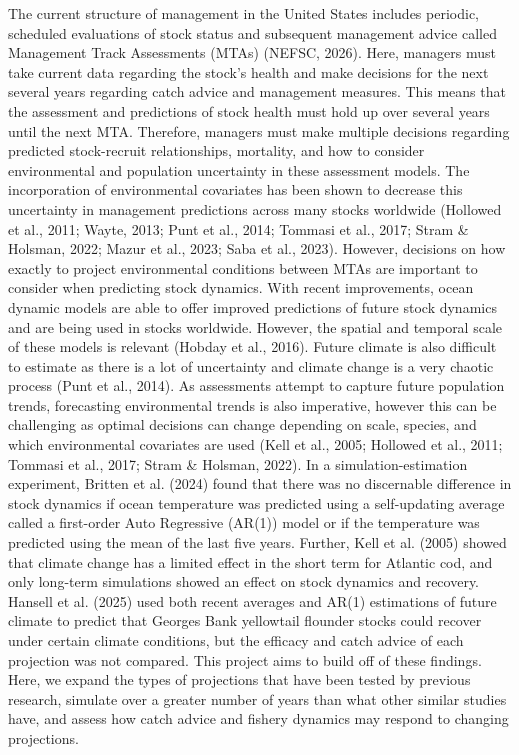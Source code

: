 \documentclass[
  12pt,
]{article}
\begin{document}
The current structure of management in the United States includes periodic, scheduled evaluations of stock status and subsequent management advice called Management Track Assessments (MTAs) (NEFSC, 2026). Here, managers must take current data regarding the stock's health and make decisions for the next several years regarding catch advice and management measures. This means that the assessment and predictions of stock health must hold up over several years until the next MTA. Therefore, managers must make multiple decisions regarding predicted stock-recruit relationships, mortality, and how to consider environmental and population uncertainty in these assessment models. The incorporation of environmental covariates has been shown to decrease this uncertainty in management predictions across many stocks worldwide (Hollowed et al., 2011; Wayte, 2013; Punt et al., 2014; Tommasi et al., 2017; Stram \& Holsman, 2022; Mazur et al., 2023; Saba et al., 2023). However, decisions on how exactly to project environmental conditions between MTAs are important to consider when predicting stock dynamics. With recent improvements, ocean dynamic models are able to offer improved predictions of future stock dynamics and are being used in stocks worldwide. However, the spatial and temporal scale of these models is relevant (Hobday et al., 2016). Future climate is also difficult to estimate as there is a lot of uncertainty and climate change is a very chaotic process (Punt et al., 2014). As assessments attempt to capture future population trends, forecasting environmental trends is also imperative, however this can be challenging as optimal decisions can change depending on scale, species, and which environmental covariates are used (Kell et al., 2005; Hollowed et al., 2011; Tommasi et al., 2017; Stram \& Holsman, 2022). In a simulation-estimation experiment, Britten et al. (2024) found that there was no discernable difference in stock dynamics if ocean temperature was predicted using a self-updating average called a first-order Auto Regressive (AR(1)) model or if the temperature was predicted using the mean of the last five years. Further, Kell et al. (2005) showed that climate change has a limited effect in the short term for Atlantic cod, and only long-term simulations showed an effect on stock dynamics and recovery. Hansell et al. (2025) used both recent averages and AR(1) estimations of future climate to predict that Georges Bank yellowtail flounder stocks could recover under certain climate conditions, but the efficacy and catch advice of each projection was not compared. This project aims to build off of these findings. Here, we expand the types of projections that have been tested by previous research, simulate over a greater number of years than what other similar studies have, and assess how catch advice and fishery dynamics may respond to changing projections.
\end{document}
